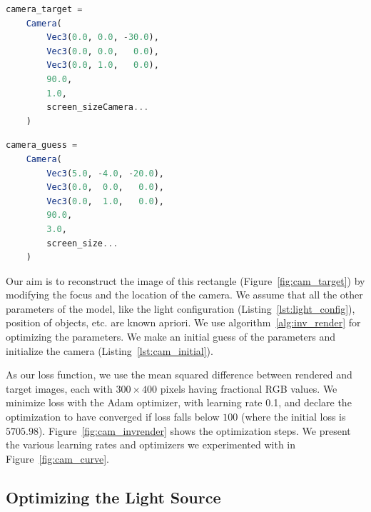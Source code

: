 \documentclass{juliacon}
\begin{document}
\noindent
\begin{minipage}{\linewidth}
\begin{lstlisting}[caption = {Camera Parameters to be Reconstructed},
                   label = {lst:cam_opt},
                   captionpos = b,
                   language = Julia]
camera_target =
    Camera(
        Vec3(0.0, 0.0, -30.0),
        Vec3(0.0, 0.0,   0.0),
        Vec3(0.0, 1.0,   0.0),
        90.0,
        1.0,
        screen_sizeCamera...
    )
\end{lstlisting}
\end{minipage}

\noindent
\begin{minipage}{\linewidth}
\begin{lstlisting}[caption = {Initial Guess of the Camera Parameters},
                   label = {lst:cam_initial},
                   captionpos = b,
                   language = Julia]
camera_guess =
    Camera(
        Vec3(5.0, -4.0, -20.0),
        Vec3(0.0,  0.0,   0.0),
        Vec3(0.0,  1.0,   0.0),
        90.0,
        3.0,
        screen_size...
    )
\end{lstlisting}
\end{minipage}

Our aim is to reconstruct the image of this rectangle (Figure~\ref{fig:cam_target}) by modifying the focus and the location of the camera. We assume that all the other parameters of the model, like the light configuration (Listing~\ref{lst:light_config}), position of objects, etc. are known apriori. We use algorithm~\ref{alg:inv_render} for optimizing the parameters. We make an initial guess of the parameters and initialize the camera (Listing~\ref{lst:cam_initial}).

As our loss function, we use the mean squared difference between rendered and target images, each with $300\times400$ pixels having fractional RGB values. We minimize loss with the Adam optimizer, with learning rate 0.1, and declare the optimization to have converged if loss falls below $100$ (where the initial loss is $5705.98$). Figure~\ref{fig:cam_invrender} shows the optimization steps. We present the various learning rates and optimizers we experimented with in Figure~\ref{fig:cam_curve}.

\subsection{Optimizing the Light Source}
\label{sec:light_source}
\end{document}
